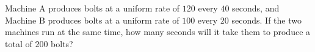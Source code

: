 Machine A produces bolts at a uniform rate of $120$ every $40$ seconds, and Machine B produces bolts at a uniform rate of $100$ every $20$ seconds. If the two machines run at the same time, how many seconds will it take them to produce a total of $200$ bolts?
